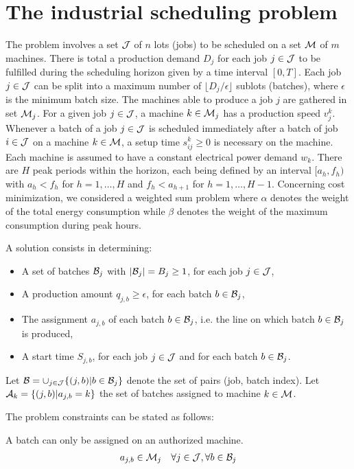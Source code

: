 \section{The industrial scheduling problem}
\label{sec:prob}

The problem involves a set ${\cal J}$ of $n$ lots (jobs) to be
scheduled on a set ${\cal M}$ of $m$ machines. There is total a
production demand $D_j$ for each job $j\in{\cal J}$ to be fulfilled
during the scheduling horizon given by a time interval $[0,T]$. Each
job $j\in{\cal J}$ can be split into a maximum number of $\lfloor
D_j/\epsilon \rfloor$ sublots (batches), where $\epsilon$ is the
minimum batch size. The machines able to produce a job $j$ are
gathered in set ${\cal M}_j$. For a given job $j\in{\cal J}$, a
machine $k\in {\cal M}_j$ has a production speed $v_{j}^{k}$. Whenever
a batch of a job $j\in{\cal J}$ is scheduled immediately after a batch
of job $i\in{\cal J}$ on a machine $k\in{\cal M}$, a setup time
$s_{ij}^k\geq 0$ is necessary on the machine. Each machine is assumed
to have a constant electrical power demand $w_k$. There are $H$ peak
periods within the horizon, each being defined by an interval
$[a_h,f_h)$ with $a_h<f_{h}$ for $h=1,\ldots,H$ and $f_h<a_{h+1}$ for 
  $h=1,\ldots,H-1$. Concerning cost minimization, we considered a
  weighted sum problem where $\alpha$ denotes the weight of the total
  energy consumption while $\beta$ denotes the weight of the maximum
  consumption during peak hours.

A solution consists in determining:
\begin{itemize}
\item A set of batches ${\cal B}_j$ with $|{\cal B}_j|=B_j\geq 1$, for
  each job $j\in{\cal J}$,
\item A production amount $q_{j,b}\geq \epsilon$, for each batch
  $b\in{\cal B}_j$,
\item The assignment $a_{j,b}$ of each batch $b \in {\cal B}_j$, i.e. 
  the line on which batch $b \in {\cal B}_j$ is produced,
\item A start time $S_{j,b}$, for each job $j\in{\cal J}$ and for each
  batch $b\in{\cal B}_j$.
\end{itemize}
Let ${\cal B}=\cup_{j\in{\cal J}}\{(j,b)|b\in{\cal B}_j\}$ denote the
set of pairs (job, batch index). Let ${\cal A}_k=\{(j,b)|a_{j,b}=k\}$ 
the set of batches assigned to machine $k\in{\cal M}$.

The problem constraints can be stated as follows:

A batch can only be assigned on an authorized machine.
\begin{eqnarray}
a_{j,b} \in {\cal M}_j \quad \forall j\in {\cal J},\forall b\in{\cal B}_j
\label{ct:2}
\end{eqnarray}

